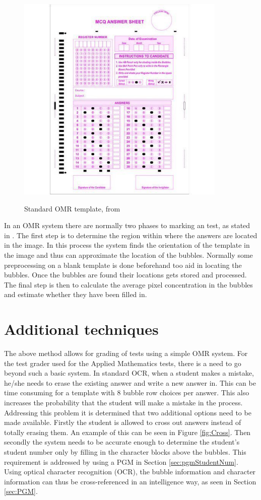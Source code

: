 \begin{figure}
  \centering
  \includegraphics[width=10cm]{omrTemplate}\\
  \caption{Standard OMR template, from \citet{stdTemplate}}%
  \label{fig:omrTemplate}
\end{figure}

In an OMR system there are normally two phases to marking an test, as stated in \citet{DraganI2003}. The first step is to determine the region within where the answers are located in the image. In this process the system finds the orientation of the template in the image and thus can approximate the location of the bubbles. Normally some preprocessing on a blank template is done beforehand too aid in locating the bubbles. Once the bubbles are found their locations gets stored and processed. The final step is then to calculate the average pixel concentration in the bubbles and estimate whether they have been filled in.

\section{Additional techniques}
The above method allows for grading of tests using a simple OMR system. For the test grader used for the Applied Mathematics tests, there is a need to go beyond such a basic system.  In standard OCR, when a student makes a mistake, he/she needs to erase the existing answer and write a new answer in. This can be time consuming for a template with 8 bubble row choices per answer. This also increases the probability that the student will make a mistake in the process. Addressing this problem it is determined that two additional options need to be made available. Firstly the student is allowed to cross out answers instead of totally erasing them. An example of this can be seen in Figure \ref{fig:Cross}. Then secondly the system needs to be accurate enough to determine the student's student number only by filling in the character blocks above the bubbles. This requirement is addressed by using a PGM in Section \ref{sec:pgmStudentNum}. Using optical character recognition (OCR), the bubble information and character information can thus be cross-referenced in an intelligence way, as seen in Section \ref{sec:PGM}.

